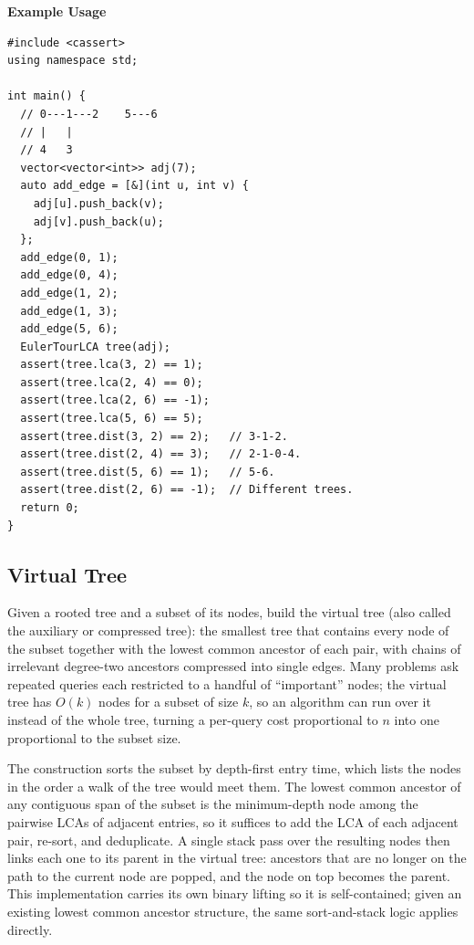 \textbf{Example Usage}\par
\begin{lstlisting}[style=cpp]
#include <cassert>
using namespace std;

int main() {
  // 0---1---2    5---6
  // |   |
  // 4   3
  vector<vector<int>> adj(7);
  auto add_edge = [&](int u, int v) {
    adj[u].push_back(v);
    adj[v].push_back(u);
  };
  add_edge(0, 1);
  add_edge(0, 4);
  add_edge(1, 2);
  add_edge(1, 3);
  add_edge(5, 6);
  EulerTourLCA tree(adj);
  assert(tree.lca(3, 2) == 1);
  assert(tree.lca(2, 4) == 0);
  assert(tree.lca(2, 6) == -1);
  assert(tree.lca(5, 6) == 5);
  assert(tree.dist(3, 2) == 2);   // 3-1-2.
  assert(tree.dist(2, 4) == 3);   // 2-1-0-4.
  assert(tree.dist(5, 6) == 1);   // 5-6.
  assert(tree.dist(2, 6) == -1);  // Different trees.
  return 0;
}
\end{lstlisting}
\subsection{Virtual Tree}
\label{sec:2.8.6}
Given a rooted tree and a subset of its nodes, build the virtual tree (also called the auxiliary or compressed tree): the smallest tree that contains every node of the subset together with the lowest common ancestor of each pair, with chains of irrelevant degree-two ancestors compressed into single edges. Many problems ask repeated queries each restricted to a handful of ``important'' nodes; the virtual tree has $O(k)$ nodes for a subset of size $k$, so an algorithm can run over it instead of the whole tree, turning a per-query cost proportional to $n$ into one proportional to the subset size.

The construction sorts the subset by depth-first entry time, which lists the nodes in the order a walk of the tree would meet them. The lowest common ancestor of any contiguous span of the subset is the minimum-depth node among the pairwise LCAs of adjacent entries, so it suffices to add the LCA of each adjacent pair, re-sort, and deduplicate. A single stack pass over the resulting nodes then links each one to its parent in the virtual tree: ancestors that are no longer on the path to the current node are popped, and the node on top becomes the parent. This implementation carries its own binary lifting so it is self-contained; given an existing lowest common ancestor structure, the same sort-and-stack logic applies directly.

